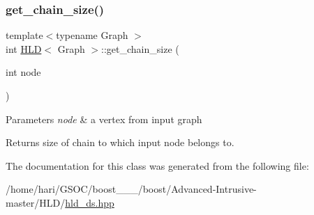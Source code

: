 \subsubsection{\texorpdfstring{get\+\_\+chain\+\_\+size()}{get\_chain\_size()}}
{\footnotesize\ttfamily template$<$typename Graph $>$ \\
int \hyperlink{classHLD}{H\+LD}$<$ Graph $>$\+::get\+\_\+chain\+\_\+size (\begin{DoxyParamCaption}\item[{int}]{node }\end{DoxyParamCaption})\hspace{0.3cm}{\ttfamily [inline]}}


\begin{DoxyParams}{Parameters}
{\em node} & a vertex from input graph \\
\hline
\end{DoxyParams}
\begin{DoxyReturn}{Returns}
size of chain to which input node belongs to. 
\end{DoxyReturn}


The documentation for this class was generated from the following file\+:\begin{DoxyCompactItemize}
\item 
/home/hari/\+G\+S\+O\+C/boost\+\_\+\_\+\_/boost/\+Advanced-\/\+Intrusive-\/master/\+H\+L\+D/\hyperlink{hld__ds_8hpp}{hld\+\_\+ds.\+hpp}\end{DoxyCompactItemize}
